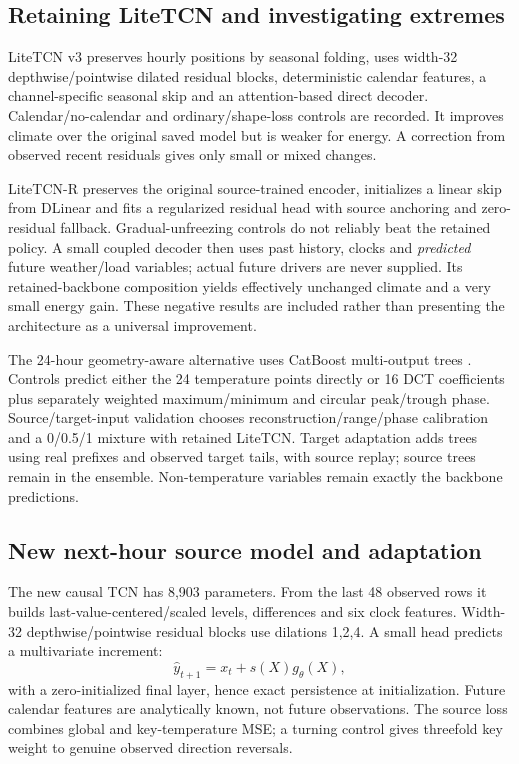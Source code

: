 \documentclass[twoside,english]{article}
\begin{document}
\subsection{Retaining LiteTCN and investigating extremes}
LiteTCN v3 preserves hourly positions by seasonal folding, uses width-32 depthwise/pointwise dilated residual blocks, deterministic calendar features, a channel-specific seasonal skip and an attention-based direct decoder. Calendar/no-calendar and ordinary/shape-loss controls are recorded. It improves climate over the original saved model but is weaker for energy. A correction from observed recent residuals gives only small or mixed changes.

LiteTCN-R preserves the original source-trained encoder, initializes a linear skip from DLinear and fits a regularized residual head with source anchoring and zero-residual fallback. Gradual-unfreezing controls do not reliably beat the retained policy. A small coupled decoder then uses past history, clocks and \emph{predicted} future weather/load variables; actual future drivers are never supplied. Its retained-backbone composition yields effectively unchanged climate and a very small energy gain. These negative results are included rather than presenting the architecture as a universal improvement.

The 24-hour geometry-aware alternative uses CatBoost multi-output trees \citep{CatBoost}. Controls predict either the 24 temperature points directly or 16 DCT coefficients plus separately weighted maximum/minimum and circular peak/trough phase. Source/target-input validation chooses reconstruction/range/phase calibration and a 0/0.5/1 mixture with retained LiteTCN. Target adaptation adds trees using real prefixes and observed target tails, with source replay; source trees remain in the ensemble. Non-temperature variables remain exactly the backbone predictions.

\subsection{New next-hour source model and adaptation}
The new causal TCN has 8,903 parameters. From the last 48 observed rows it builds last-value-centered/scaled levels, differences and six clock features. Width-32 depthwise/pointwise residual blocks use dilations 1,2,4. A small head predicts a multivariate increment:
\begin{equation}
\widehat y_{t+1}=x_t+s(X)g_\theta(X),
\end{equation}
with a zero-initialized final layer, hence exact persistence at initialization. Future calendar features are analytically known, not future observations. The source loss combines global and key-temperature MSE; a turning control gives threefold key weight to genuine observed direction reversals.
\end{document}
